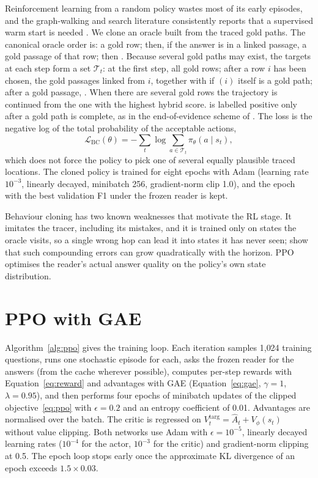 Reinforcement learning from a random policy wastes most of its early episodes, and the graph-walking and search literature consistently reports that a supervised warm start is needed \citep{xiong2017deeppath,sun2026sogr1}. We clone an oracle built from the traced gold paths. The canonical oracle order is: a gold row; then, if the answer is in a linked passage, a gold passage of that row; then \STOP. Because several gold paths may exist, the targets at each step form a set $\mathcal{T}_t$: at the first step, all gold rows; after a row $i$ has been chosen, the gold passages linked from $i$, together with \STOP{} if $(i)$ itself is a gold path; after a gold passage, \STOP. When there are several gold rows the trajectory is continued from the one with the highest hybrid score. \STOP{} is labelled positive only after a gold path is complete, as in the end-of-evidence scheme of \citet{asai2020learning}. The loss is the negative log of the total probability of the acceptable actions,
\begin{equation}
  \mathcal{L}_{\mathrm{BC}}(\theta)=-\sum_t\log\sum_{a\in\mathcal{T}_t}\pi_\theta(a\mid s_t),
\end{equation}
which does not force the policy to pick one of several equally plausible traced locations. The cloned policy is trained for eight epochs with Adam \citep{kingma2015adam} (learning rate $10^{-3}$, linearly decayed, minibatch 256, gradient-norm clip 1.0), and the epoch with the best validation F1 under the frozen reader is kept.

Behaviour cloning has two known weaknesses that motivate the RL stage. It imitates the tracer, including its mistakes, and it is trained only on states the oracle visits, so a single wrong hop can lead it into states it has never seen; \citet{ross2011reduction} show that such compounding errors can grow quadratically with the horizon. PPO optimises the reader's actual answer quality on the policy's own state distribution.

\section{PPO with GAE}
\label{sec:ppo}

Algorithm~\ref{alg:ppo} gives the training loop. Each iteration samples 1{,}024 training questions, runs one stochastic episode for each, asks the frozen reader for the answers (from the cache wherever possible), computes per-step rewards with Equation~\eqref{eq:reward} and advantages with GAE (Equation~\eqref{eq:gae}, $\gamma=1$, $\lambda=0.95$), and then performs four epochs of minibatch updates of the clipped objective~\eqref{eq:ppo} with $\epsilon=0.2$ and an entropy coefficient of 0.01. Advantages are normalised over the batch. The critic is regressed on $V^{\mathrm{targ}}_t=\hat A_t+V_\phi(s_t)$ without value clipping. Both networks use Adam with $\epsilon=10^{-5}$, linearly decayed learning rates ($10^{-4}$ for the actor, $10^{-3}$ for the critic) and gradient-norm clipping at 0.5. The epoch loop stops early once the approximate KL divergence of an epoch exceeds $1.5\times0.03$.

